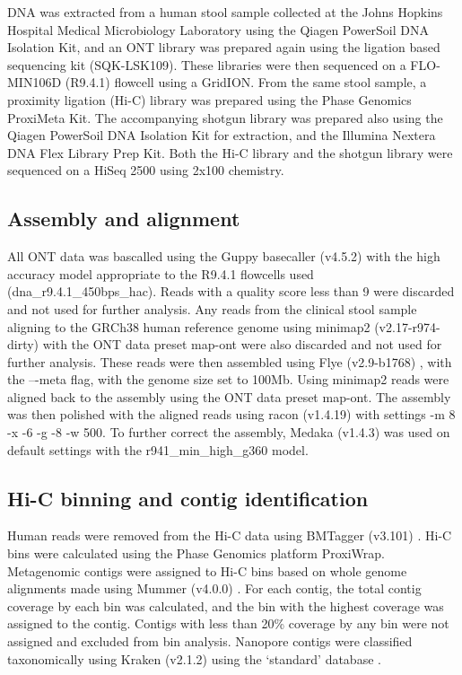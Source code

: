 DNA was extracted from a human stool sample collected at the Johns Hopkins Hospital Medical Microbiology Laboratory using the Qiagen PowerSoil DNA Isolation Kit, and an ONT library was prepared again using the ligation based sequencing kit (SQK-LSK109). These libraries were then sequenced on a FLO-MIN106D (R9.4.1) flowcell using a GridION. From the same stool sample, a proximity ligation (Hi-C) library was prepared using the Phase Genomics ProxiMeta Kit. The accompanying shotgun library was prepared also using the Qiagen PowerSoil DNA Isolation Kit for extraction, and the Illumina Nextera DNA Flex Library Prep Kit. Both the Hi-C library and the shotgun library were sequenced on a HiSeq 2500 using 2x100 chemistry.


\subsection{Assembly and alignment}
\label{sec:methods}

All ONT data was bascalled using the Guppy basecaller (v4.5.2) with the high accuracy model appropriate to the R9.4.1 flowcells used (dna\_r9.4.1\_450bps\_hac). Reads with a quality score less than 9 were discarded and not used for further analysis. Any reads from the clinical stool sample aligning to the GRCh38 human reference genome using minimap2 (v2.17-r974-dirty) \citep{Li2018-eq}  with the ONT data preset map-ont were also discarded and not used for further analysis. These reads were then assembled using Flye (v2.9-b1768) \citep{Kolmogorov2020-rm}, with the –-meta flag, with the genome size set to 100Mb. Using minimap2 \citep{Li2018-eq} reads were aligned back to the assembly using the ONT data preset map-ont. The assembly was then polished with the aligned reads using racon \citep{Vaser2017-zk}(v1.4.19) with settings -m 8 -x -6 -g -8 -w 500. To further correct the assembly, Medaka (v1.4.3) was used on default settings with the r941\_min\_high\_g360 model.

\subsection{Hi-C binning and contig identification}
\label{sec:methods}

Human reads were removed from the Hi-C data using BMTagger (v3.101) \citep{Rotmistrovsky2011-ak}. Hi-C bins were calculated using the Phase Genomics platform ProxiWrap. Metagenomic contigs were assigned to Hi-C bins based on whole genome alignments made using Mummer (v4.0.0) \citep{Marcais2018-mm}. For each contig, the total contig coverage by each bin was calculated, and the bin with the highest coverage was assigned to the contig. Contigs with less than 20\% coverage by any bin were not assigned and excluded from bin analysis. Nanopore contigs were classified taxonomically using Kraken (v2.1.2) using the ‘standard’ database \citep{Wood2019-uy}.

